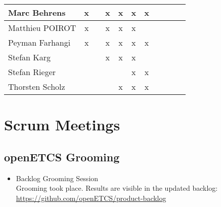 \documentclass[a4paper, 11pt]{article}
\begin{document}
\begin{tabular}{|l|c|c|c|c||c|c|c||c|c|c|}
Marc Behrens         & x &   & x & x & x & x &   \\\hline
Matthieu POIROT       & x  &   & x  & x & x &  &   \\\hline
Peyman Farhangi      & x  &   & x & x & x & x &   \\\hline
Stefan Karg          &   &   & x  & x & x &  &  \\\hline
Stefan Rieger        &   &  &  &  & x & x &  \\\hline
Thorsten Scholz      &   &   &  & x & x & x &  \\\hline
\end{tabular}


\section{Scrum Meetings}

\subsection{openETCS Grooming}
\begin{itemize}
\item Backlog Grooming Session\\
Grooming took place. Results are visible in the updated backlog:\\
\url{https://github.com/openETCS/product-backlog}

\end{itemize}
\end{document}
